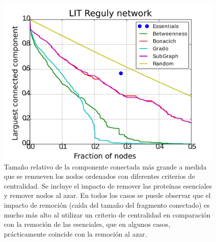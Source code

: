 \begin{figure}
\includegraphics[scale = 0.3]{figuras/LIT_Reguly_b-eps-converted-to} 
\caption{Tamaño relativo de la componente conectada más grande a medida que se remueven los nodos ordenados con diferentes criterios de centralidad. Se incluye el impacto de remover las proteínas esenciales y remover nodos al azar. En todos los casos se puede observar que el impacto de remoción (caída del tamaño del fragmento conectado) es mucho más alto al utilizar un criterio de centralidad en comparación con la remoción de las esenciales, que en algunos casos, prácticamente coincide con la remoción al azar.}
\label{fig:remocion}
\end{figure}


